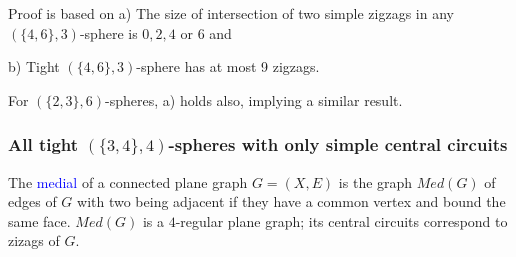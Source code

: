 \documentclass{beamer}
\begin{document}
\begin{frame}
Proof is based on a) The size of intersection of two simple
zigzags in any $(\{4,6\},3)$-sphere is $0,2,4$ or $6$ and

b) Tight $(\{4,6\},3)$-sphere has  at most 9 zigzags.
\vspace{1.5mm}

For $(\{2,3\},6)$-spheres, a) holds also,  implying a similar
result. \end{frame}



\begin{frame}\frametitle{All tight $(\{3,4\},4)$-spheres with only simple
central circuits}
\vspace{-3mm}
The \textcolor{blue}{medial} of a connected  plane graph $G=(X,E)$ is the 
graph 
$Med(G)$ of 
edges 
of $G$ with two being adjacent if they have a common vertex and bound 
the same face. 
$Med(G)$ is a $4$-regular plane graph; its central  circuits correspond to zizags of 
$G$. 


\end{frame}
\end{document}
